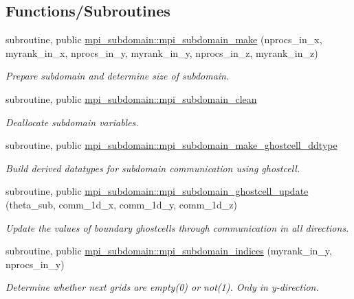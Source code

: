 \subsection*{Functions/\+Subroutines}
\begin{DoxyCompactItemize}
\item 
subroutine, public \mbox{\hyperlink{namespacempi__subdomain_a3a1e7cf64aafbebd3c09b92fc56bd311}{mpi\+\_\+subdomain\+::mpi\+\_\+subdomain\+\_\+make}} (nprocs\+\_\+in\+\_\+x, myrank\+\_\+in\+\_\+x, nprocs\+\_\+in\+\_\+y, myrank\+\_\+in\+\_\+y, nprocs\+\_\+in\+\_\+z, myrank\+\_\+in\+\_\+z)
\begin{DoxyCompactList}\small\item\em Prepare subdomain and determine size of subdomain. \end{DoxyCompactList}\item 
subroutine, public \mbox{\hyperlink{namespacempi__subdomain_a56e9f2afd59e45fcada0f1c21a90eefe}{mpi\+\_\+subdomain\+::mpi\+\_\+subdomain\+\_\+clean}}
\begin{DoxyCompactList}\small\item\em Deallocate subdomain variables. \end{DoxyCompactList}\item 
subroutine, public \mbox{\hyperlink{namespacempi__subdomain_ad788c273d92ea7058caf0874bffdad6d}{mpi\+\_\+subdomain\+::mpi\+\_\+subdomain\+\_\+make\+\_\+ghostcell\+\_\+ddtype}}
\begin{DoxyCompactList}\small\item\em Build derived datatypes for subdomain communication using ghostcell. \end{DoxyCompactList}\item 
subroutine, public \mbox{\hyperlink{namespacempi__subdomain_a2e34a77537009dd448375e8fdc8d5b62}{mpi\+\_\+subdomain\+::mpi\+\_\+subdomain\+\_\+ghostcell\+\_\+update}} (theta\+\_\+sub, comm\+\_\+1d\+\_\+x, comm\+\_\+1d\+\_\+y, comm\+\_\+1d\+\_\+z)
\begin{DoxyCompactList}\small\item\em Update the values of boundary ghostcells through communication in all directions. \end{DoxyCompactList}\item 
subroutine, public \mbox{\hyperlink{namespacempi__subdomain_afe948dc18da021f2448cf9a6265155fe}{mpi\+\_\+subdomain\+::mpi\+\_\+subdomain\+\_\+indices}} (myrank\+\_\+in\+\_\+y, nprocs\+\_\+in\+\_\+y)
\begin{DoxyCompactList}\small\item\em Determine whether next grids are empty(0) or not(1). Only in y-\/direction. \end{DoxyCompactList}\item 

\end{DoxyCompactItemize}
